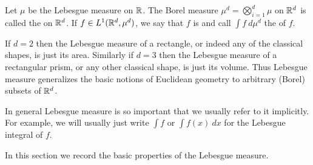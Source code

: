 \begin{definition}
Let $\mu$ be the Lebesgue measure on $\mathbb{R}$.
The Borel measure $\mu^d = \bigotimes_{i=1}^d \mu$ on $\mathbb{R}^d$ is called the  on $\mathbb{R}^d$.
If $f \in L^1(\mathbb{R}^d, \mu^d)$, we say that $f$ is  and call $\int f~d\mu^d$ the  of $f$.
\end{definition}

If $d = 2$ then the Lebesgue measure of a rectangle, or indeed any of the classical shapes, is just its area.
Similarly if $d = 3$ then the Lebesgue measure of a rectangular prism, or any other classical shape, is just its volume.
Thus Lebesgue measure generalizes the basic notions of Euclidean geometry to arbitrary (Borel) subsets of $\mathbb{R}^d$.

In general Lebesgue measure is so important that we usually refer to it implicitly.
For example, we will usually just write $\int f$ or $\int f(x) ~dx$ for the Lebesgue integral of $f$.

In this section we record the basic properties of the Lebesgue measure.

